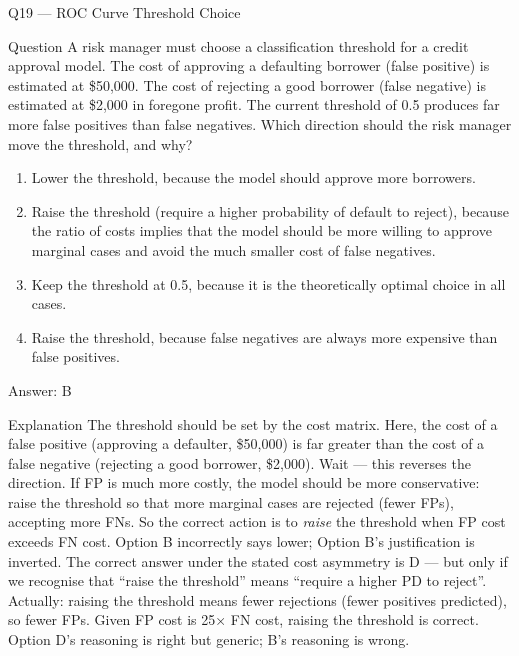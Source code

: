 \documentclass[aspectratio=169,8pt]{beamer}
\begin{document}
	\begin{frame}{Q19 --- ROC Curve Threshold Choice}
		\begin{block}{Question}
			A risk manager must choose a classification threshold for a credit approval model. The cost of approving a defaulting borrower (false positive) is estimated at \$50,000. The cost of rejecting a good borrower (false negative) is estimated at \$2,000 in foregone profit. The current threshold of 0.5 produces far more false positives than false negatives. Which direction should the risk manager move the threshold, and why?
		\end{block}
		\begin{enumerate}
			\item Lower the threshold, because the model should approve more borrowers.
			\item Raise the threshold (require a higher probability of default to reject), because the ratio of costs implies that the model should be more willing to approve marginal cases and avoid the much smaller cost of false negatives.
			\item Keep the threshold at 0.5, because it is the theoretically optimal choice in all cases.
			\item Raise the threshold, because false negatives are always more expensive than false positives.
		\end{enumerate}
		\begin{exampleblock}{Answer: B}\end{exampleblock}
		\begin{block}{Explanation}
			The threshold should be set by the cost matrix. Here, the cost of a false positive (approving a defaulter, \$50,000) is far greater than the cost of a false negative (rejecting a good borrower, \$2,000). Wait --- this reverses the direction. If FP is much more costly, the model should be more conservative: raise the threshold so that more marginal cases are rejected (fewer FPs), accepting more FNs. So the correct action is to \emph{raise} the threshold when FP cost exceeds FN cost. Option B incorrectly says lower; Option B's justification is inverted. The correct answer under the stated cost asymmetry is D --- but only if we recognise that ``raise the threshold'' means ``require a higher PD to reject''. Actually: raising the threshold means fewer rejections (fewer positives predicted), so fewer FPs. Given FP cost is 25× FN cost, raising the threshold is correct. Option D's reasoning is right but generic; B's reasoning is wrong.
		\end{block}
	\end{frame}
	
\end{document}
